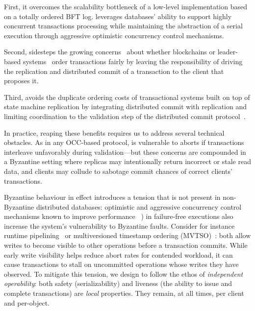 First, it overcomes the scalability bottleneck of a low-level
implementation based on a totally ordered BFT log. \sys leverages databases' ability to support highly concurrent
transactions processing while maintaining the abstraction of a serial execution through aggressive optimistic concurrency control
mechanisms.

Second, \sys{} sidesteps the growing concerns~\cite{herlihy2016enhancing} about whether blockchains or leader-based systems~\cite{Kotla07Zyzzyva,castro1999practical} order transactions fairly by leaving the responsibility of driving the replication and distributed commit of a transaction to the client that proposes it.

Third, \sys{} avoids the duplicate ordering costs of transactional systems
built on top of state machine replication by integrating distributed commit with 
replication and
limiting coordination to the validation step of the distributed commit
protocol~\cite{zhang2015tapir,mu2016consolidating}.

In practice, reaping these benefits requires us to address several
technical obstacles. As in any OCC-based protocol, \sys
is vulnerable to aborts if transactions interleave unfavorably during
validation---but these concerns are compounded in a Byzantine
setting where replicas may intentionally return incorrect or stale read data, and clients may collude to sabotage commit chances of correct clients' transactions.

Byzantine behaviour in effect introduces a tension that is not present in non-Byzantine
distributed databases: optimistic and aggressive concurrency control mechanisms known
to improve performance ~\cite{kung1981occ,bernstein1983mcc,reed1983atomic,xie2015callas,zhang2015tapir}) in failure-free executions also increase the system's vulnerability to Byzantine faults. Consider for instance runtime pipelining~\cite{xie2015callas,su2017tebaldi} or multiversioned timestamp ordering (MVTSO)~\cite{bernstein1983mcc,reed1983atomic}: both allow writes to become visible to other operations before a transaction commits. While early write visibility helps reduce abort rates for
contended workload, it can cause transactions to stall on uncommitted operations whose writes they have observed. To mitigate this tension, we design \sys{} to follow the ethos of \textit{independent operability}: both safety (serializability) and liveness (the ability to issue and complete transactions) are \textit{local} properties. They remain, at all times, per client and per-object.  

